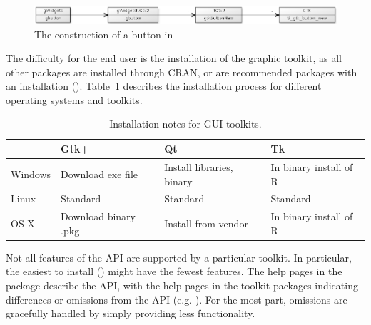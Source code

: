\begin{figure}
  \centering
  \includegraphics[width=.95\textwidth]{fig-gWidgets-yuml}
  \caption{The construction of a button in }
  \label{fig:gWidgets-yuml}
\end{figure}


The difficulty for the end user is the installation of the graphic
toolkit, as all other packages are installed through CRAN, or are
recommended packages with an \R\/ installation
(). Table~\ref{tab:gWidgets-installation} describes the installation process for
different operating systems and toolkits.

\begin{table}
\centering
\label{tab:gWidgets-installation}
\caption{Installation notes for GUI toolkits.}
\begin{tabular}{@{}lp{}p{}p{}@{}}
\toprule

&Gtk+&Qt&Tk\\
\midrule
Windows&Download exe file&Install libraries, binary&In binary install of R\\Linux&Standard&Standard&Standard\\OS X&Download binary .pkg&Install from vendor&In binary install of R
\\ \bottomrule
\end{tabular}
\end{table}
Not all features of the API are supported by a particular toolkit. In
particular, the easiest to install () might have the
fewest features.  The help pages in the  package
describe the API, with the help pages in the toolkit packages
indicating differences or omissions from the API (e.g. ). For the most part,
omissions are gracefully handled by simply providing less
functionality.



